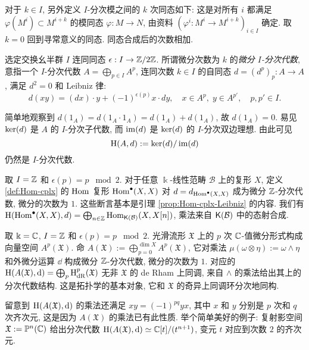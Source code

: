 对于 $k \in I$, 另外定义 $I$-分次模之间的 $k$ 次同态如下: 这是对所有 $i$ 都满足 $\varphi(M^i) \subset M^{i+k}$ 的模同态 $\varphi: M \to N$, 由资料 $\left(\varphi^i: M^i \to M^{i+k}\right)_{i \in I}$ 确定. 取 $k=0$ 回到寻常意义的同态. 同态合成后的次数相加.

\begin{definition}\label{def:dg-algebra-preview}
	选定交换幺半群 $I$ 连同同态 $\epsilon: I \to \mathbb{Z}/2\mathbb{Z}$. 所谓微分次数为 $k$ 的\emph{微分 $I$-分次代数}, 意指一个 $I$-分次代数 $A = \bigoplus_{p \in I} A^p$, 连同次数 $k \in I$ 的自同态 $d = (d^p)_p: A \to A$, 满足 $d^2 = 0$ 和 Leibniz 律:
	\[ d(xy) = (dx) \cdot y + (-1)^{\epsilon(p)} x \cdot dy, \quad x \in A^p, \; y \in A^{p'}, \quad p, p' \in I. \]
\end{definition}

简单地观察到 $d(1_A) = d(1_A \cdot 1_A)  = d(1_A) + d(1_A)$, 故 $d(1_A) = 0$. 易见 $\operatorname{ker}(d)$ 是 $A$ 的 $I$-分次子代数, 而 $\operatorname{im}(d)$ 是 $\operatorname{ker}(d)$ 的 $I$-分次双边理想. 由此可见
\[ \operatorname{H}(A, d) := \operatorname{ker}(d)/\operatorname{im}(d) \]
仍然是 $I$-分次代数.

\begin{example}
	取 $I = \mathbb{Z}$ 和 $\epsilon(p) = p \;\bmod 2$. 对于任意 $\Bbbk$-线性范畴 $\mathcal{B}$ 上的复形 $X$, 定义 \ref{def:Hom-cplx} 的 $\operatorname{Hom}$ 复形 $\operatorname{Hom}^\bullet(X, X)$ 对 $d = d_{\operatorname{Hom}^\bullet(X, X)}$ 成为微分 $\mathbb{Z}$-分次代数, 微分的次数为 $1$. 这些断言基本是引理 \ref{prop:Hom-cplx-Leibniz} 的内容. 我们有 $\operatorname{H}(\operatorname{Hom}^\bullet(X, X), d) = \bigoplus_{n \in \mathbb{Z}} \operatorname{Hom}_{\mathsf{K}(\mathcal{B})}(X, X[n])$, 乘法来自 $\mathsf{K}(\mathcal{B})$ 中的态射合成.
\end{example}

\begin{example}
	取 $\Bbbk = \mathbb{C}$, $I = \mathbb{Z}$ 和 $\epsilon(p) = p \;\bmod 2$. 光滑流形 $\mathfrak{X}$ 上的 $p$ 次 $\mathbb{C}$-值微分形式构成向量空间 $A^p(\mathfrak{X})$. 命 $A(\mathfrak{X}) := \bigoplus_{p=0}^{\dim X} A^p(\mathfrak{X})$, 它对乘法 $\mu(\omega \otimes \eta) := \omega \wedge \eta$ 和外微分运算 $\dd$ 构成微分 $\mathbb{Z}$-分次代数, 微分的次数为 $1$. 对应的 $\operatorname{H}(A(\mathfrak{X}), \mathop{}\!\mathrm{d}) = \bigoplus_p \operatorname{H}^p_{\mathrm{dR}}(\mathfrak{X})$ 无非 $\mathfrak{X}$ 的 de Rham 上同调, 来自 $\wedge$ 的乘法给出其上的分次代数结构. 这是拓扑学的基本对象, 它和 $\mathfrak{X}$ 的奇异上同调环分次地同构.
	
	留意到 $\operatorname{H}(A(\mathfrak{X}), \mathop{}\!\mathrm{d})$ 的乘法还满足 $xy = (-1)^{pq} yx$, 其中 $x$ 和 $y$ 分别是 $p$ 次和 $q$ 次齐次元, 这是因为 $A(\mathfrak{X})$ 的乘法已有此性质. 举个简单美好的例子: 复射影空间 $\mathfrak{X} := \mathbb{P}^n(\mathbb{C})$ 给出分次代数 $\operatorname{H}(A(\mathfrak{X}), \mathop{}\!\mathrm{d}) \simeq \mathbb{C}[t]/(t^{n+1})$, 变元 $t$ 对应到次数 $2$ 的齐次元.
\end{example}

